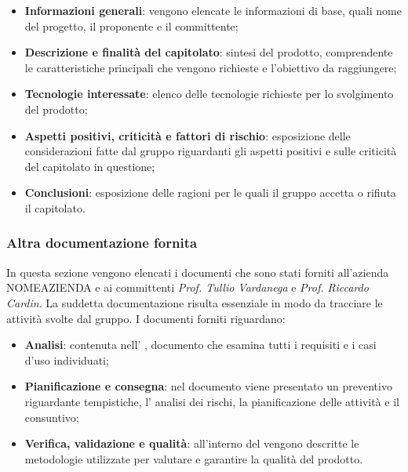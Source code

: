 \begin{itemize}

\item \textbf{Informazioni generali}: vengono elencate le informazioni di base,  quali nome del progetto, il proponente e il committente;

\item \textbf{Descrizione e finalità del capitolato}: sintesi del prodotto, comprendente le caratteristiche principali che vengono richieste e l'obiettivo da raggiungere;

\item \textbf{Tecnologie interessate}: elenco delle tecnologie richieste per lo svolgimento del prodotto;

\item \textbf{Aspetti positivi, criticità e fattori di rischio}: esposizione delle considerazioni fatte dal gruppo riguardanti gli aspetti positivi e sulle criticità del capitolato in questione;

\item \textbf{Conclusioni}: esposizione delle ragioni per le quali il gruppo accetta o rifiuta il capitolato.

\end{itemize}

\subsubsection{Altra documentazione fornita}

In questa sezione vengono elencati i documenti che sono stati forniti all'azienda NOMEAZIENDA e ai committenti \textit{Prof. Tullio Vardanega} e \textit{Prof. Riccardo Cardin}. La suddetta documentazione risulta essenziale in modo da tracciare le attività  svolte dal gruppo.
I documenti forniti riguardano: 
\begin{itemize}

\item \textbf{Analisi}: contenuta nell' \AdR{}, documento che esamina tutti i requisiti e i casi d'uso individuati;
\item \textbf{Pianificazione e consegna}: nel documento \PdP{} viene presentato un preventivo riguardante tempistiche, l' analisi dei rischi, la pianificazione delle attività e il consuntivo;
\item \textbf{Verifica, validazione e qualità}: all'interno del \PdQ{} vengono descritte le metodologie utilizzate per valutare e garantire la qualità del prodotto.

\end{itemize}

